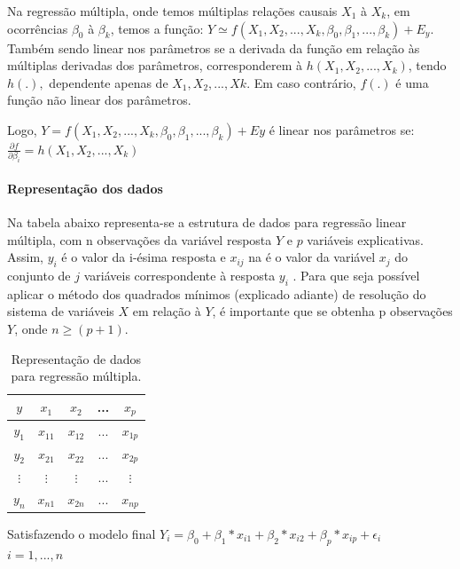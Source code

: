 \documentclass[	12pt, Times, openright, twoside, a4paper, english, brazil]{abntex2}
\begin{document}
          Na regressão múltipla, onde temos múltiplas relações causais $X_1$ à $X_k$, em ocorrências $\beta_0$ à $\beta_k$, temos a função: $Y \simeq f(X_1, X_2, ..., X_k, \beta_0, \beta_1, ..., \beta_k) + E_y$. Também sendo linear nos parâmetros se a derivada da função em relação às múltiplas derivadas dos parâmetros, corresponderem à $h(X_1,X_2,...,X_k)$, tendo $h(.),$ dependente apenas de $X_1,X_2,...,X k$. Em caso contrário, $f(.)$ é uma função não linear dos parâmetros.

          Logo, $Y=f(X_1,X_2,...,X_k,\beta_0,\beta_1,...,\beta_k)+E y$ é linear nos parâmetros se:
          $\frac {\partial f}{\partial \beta_i} = h(X_1,X_2,...,X_k)$
          
          \paragraph*{Representação dos dados}
          Na tabela abaixo representa-se a estrutura de dados para regressão linear múltipla, com n observações da variável resposta $Y$ e $p$ variáveis explicativas. Assim, $y_i$ é o valor da i-ésima resposta e $x_{ij}$ na é o valor da variável $x_j$ do conjunto de $j$ variáveis correspondente à resposta $y_i$ .
          Para que seja possível aplicar o método dos quadrados mínimos (explicado adiante) de resolução do sistema de variáveis $X$ em relação à $Y$, é importante que se obtenha p observações $Y$, onde $n\geq (p+1)$.
          
          \begin{table}[!ht]
          	\centering
          		\caption{Representação de dados para regressão múltipla.}	\label{tab:regressaoMultiplaEstrutura}                  
          				\begin{tabular}{|c|c|c|c|c}          			
          				\hline $y$ & $x_1$ & $x_2$ & ... & $x_p$\\
                        \hline $y_1$ & $x_{11}$ & $x_{12}$ & ... & $x_{1p}$\\
                        \hline $y_2$ & $x_{21}$ & $x_{22}$ & ... & $x_{2p}$\\
                        \hline $\vdots$ & $\vdots$ & $\vdots$ & ... & $\vdots$\\
                        \hline $y_n$ & $x_{n1}$ & $x_{2n}$ & ... & $x_{np}$\\
          		\end{tabular}
          \end{table}
          Satisfazendo o modelo final $Y_i = \beta_0 + \beta_1*x_{i1} + \beta_2*x_{i2} + \beta_p*x_{ip} + \epsilon_i$\\
          $i=1,...,n$
          
\end{document}
